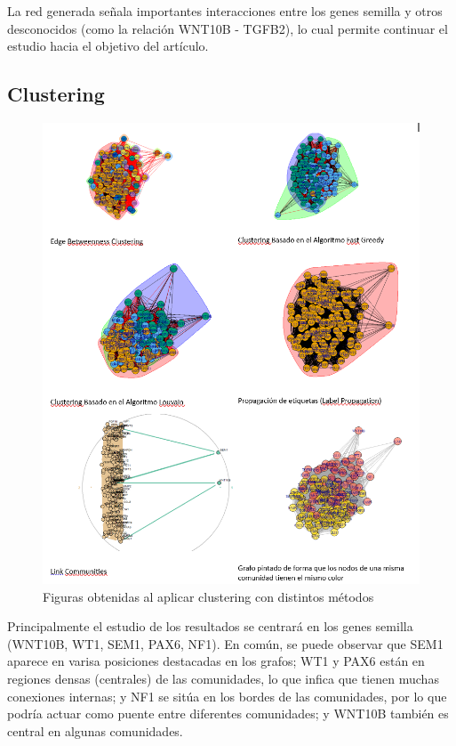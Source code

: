 La red generada señala importantes interacciones entre los genes semilla y otros desconocidos (como la relación WNT10B - TGFB2), lo cual permite continuar el estudio hacia el objetivo del artículo.

\subsection{Clustering}

\begin{figure}[h] %
	\centering
	\includegraphics[width=1\textwidth]{figures/toda_figuras_clustering.png}
	\caption{Figuras obtenidas al aplicar clustering con distintos métodos}
	\label{clustering}
\end{figure}

Principalmente el estudio de los resultados se centrará en los genes semilla (WNT10B, WT1, SEM1, PAX6, NF1). En común, se puede observar que SEM1 aparece en varisa posiciones destacadas en los grafos; WT1 y PAX6 están en regiones densas (centrales) de las comunidades, lo que infica que tienen muchas conexiones internas; y NF1 se sitúa en los bordes de las comunidades, por lo que podría actuar como puente entre diferentes comunidades; y WNT10B también es central en algunas comunidades.





